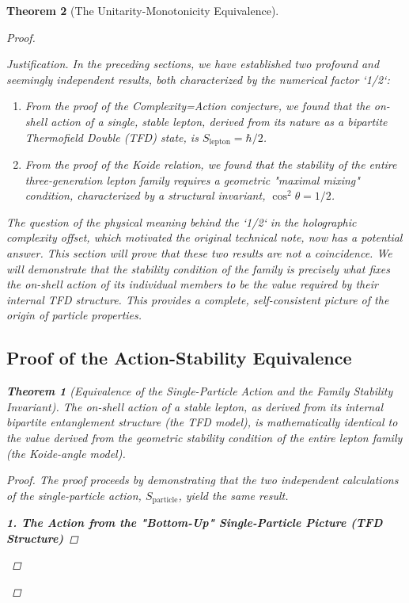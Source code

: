 \documentclass[11pt, letterpaper]{report}
\theoremstyle{plain} %
\newtheorem{theorem}{Theorem}[chapter]
\theoremstyle{definition} %
\theoremstyle{remark} %
\begin{document}
\begin{theorem}[The Unitarity-Monotonicity Equivalence]
\begin{proof}
\begin{proof}[Justification]
In the preceding sections, we have established two profound and seemingly independent results, both characterized by the numerical factor `1/2`:
\begin{enumerate}
    \item From the proof of the Complexity=Action conjecture, we found that the on-shell action of a single, stable lepton, derived from its nature as a bipartite Thermofield Double (TFD) state, is $S_{\text{lepton}} = \hbar/2$.
    \item From the proof of the Koide relation, we found that the stability of the entire three-generation lepton family requires a geometric "maximal mixing" condition, characterized by a structural invariant, $\cos^2\theta = 1/2$.
\end{enumerate}
The question of the physical meaning behind the `1/2` in the holographic complexity offset, which motivated the original technical note, now has a potential answer. This section will prove that these two results are not a coincidence. We will demonstrate that the stability condition of the family is precisely what fixes the on-shell action of its individual members to be the value required by their internal TFD structure. This provides a complete, self-consistent picture of the origin of particle properties.

\subsection{Proof of the Action-Stability Equivalence}

\begin{theorem}[Equivalence of the Single-Particle Action and the Family Stability Invariant]
\label{thm:action_stability_equivalence}
The on-shell action of a stable lepton, as derived from its internal bipartite entanglement structure (the TFD model), is mathematically identical to the value derived from the geometric stability condition of the entire lepton family (the Koide-angle model).
\end{theorem}
\begin{proof}
The proof proceeds by demonstrating that the two independent calculations of the single-particle action, $S_{\text{particle}}$, yield the same result.

\textbf{1. The Action from the "Bottom-Up" Single-Particle Picture (TFD Structure)}


\end{proof}
\end{proof}
\end{proof}
\end{theorem}
\end{document}
